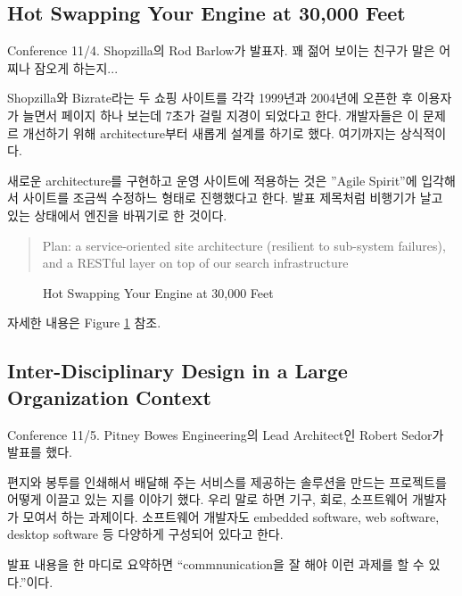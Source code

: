 \documentclass[11pt]{article}
\begin{document}
\subsection{Hot Swapping Your Engine at 30,000 Feet}

Conference 11/4. Shopzilla의 Rod Barlow가 발표자.
꽤 젊어 보이는 친구가 말은 어찌나 잠오게 하는지...
 
Shopzilla와 Bizrate라는 두 쇼핑 사이트를 각각 1999년과 2004년에 오픈한
후 이용자가 늘면서 페이지 하나 보는데 7초가 걸릴 지경이 되었다고 한다.
개발자들은 이 문제르 개선하기 위해 architecture부터 새롭게 설계를 하기로 했다.
여기까지는 상식적이다.

새로운 architecture를 구현하고 운영 사이트에 적용하는 것은 ''Agile Spirit''에
입각해서 사이트를 조금씩 수정하느 형태로 진행했다고 한다. 발표 제목처럼
비행기가 날고 있는 상태에서 엔진을 바꿔기로 한 것이다.
 
\begin{quote}
Plan: a service-oriented site architecture (resilient to
sub-system failures), and a RESTful layer on top of our search
infrastructure
\end{quote}

\begin{figure}[t]
    \begin{Frame}
        \begin{center}
        \end{center}
    \end{Frame}
    \caption{Hot Swapping Your Engine at 30,000 Feet}
    \label{swapping engine}
\end{figure}

자세한 내용은 Figure \ref{swapping engine} 참조.

\subsection{Inter-Disciplinary Design in a Large
  Organization Context}

Conference 11/5. Pitney Bowes Engineering의 Lead Architect인 
Robert Sedor가 발표를 했다.

편지와 봉투를 인쇄해서 배달해 주는 서비스를 제공하는 솔루션을 만드는
프로젝트를 어떻게 이끌고 있는 지를 이야기 했다.
우리 말로 하면 기구, 회로, 소프트웨어 개발자가 모여서 하는
과제이다. 소프트웨어 개발자도 embedded software, web software, desktop
software 등 다양하게 구성되어 있다고 한다.
 
발표 내용을 한 마디로 요약하면 ``commnunication을 잘 해야 이런 과제를 할 수 
있다.''이다.
 
\end{document}
